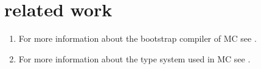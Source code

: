 \section{related work}

\begin{enumerate}
\item For more information about the bootstrap compiler of MC see \cite{jarnospaper}.
\item For more information about the type system used in MC see \cite{douwespaper}.
\end{enumerate}
